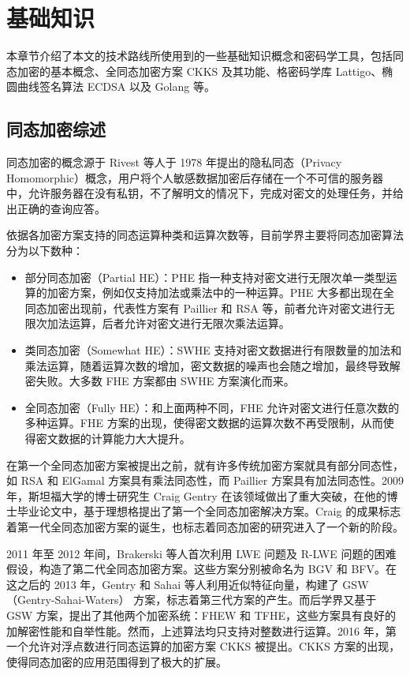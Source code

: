 \chapter{基础知识}

本章节介绍了本文的技术路线所使用到的一些基础知识概念和密码学工具，包括同态加密的基本概念、全同态加密方案 CKKS 及其功能、格密码学库 Lattigo、椭圆曲线签名算法 ECDSA 以及 Golang 等。

\section{同态加密综述}

同态加密的概念源于 Rivest 等人于 1978 年提出的隐私同态（Privacy Homomorphic）概念\cite{rivest1978data}，用户将个人敏感数据加密后存储在一个不可信的服务器中，允许服务器在没有私钥，不了解明文的情况下，完成对密文的处理任务，并给出正确的查询应答。\cite{FHEResearch}

依据各加密方案支持的同态运算种类和运算次数等，目前学界主要将同态加密算法分为以下数种：
\begin{itemize}
    \item 部分同态加密（Partial HE）：PHE 指一种支持对密文进行无限次单一类型运算的加密方案，例如仅支持加法或乘法中的一种运算。PHE 大多都出现在全同态加密出现前，代表性方案有 Paillier 和 RSA 等，前者允许对密文进行无限次加法运算，后者允许对密文进行无限次乘法运算。
    \item 类同态加密（Somewhat HE）：SWHE 支持对密文数据进行有限数量的加法和乘法运算，随着运算次数的增加，密文数据的噪声也会随之增加，最终导致解密失败。大多数 FHE 方案都由 SWHE 方案演化而来。
    \item 全同态加密（Fully HE）：和上面两种不同，FHE 允许对密文进行任意次数的多种运算。FHE 方案的出现，使得密文数据的运算次数不再受限制，从而使得密文数据的计算能力大大提升。
\end{itemize}

在第一个全同态加密方案被提出之前，就有许多传统加密方案就具有部分同态性，如 RSA 和 ElGamal 方案具有乘法同态性\cite{rivest1978method,elgamal1985public}，而 Paillier 方案具有加法同态性\cite{paillier1999public}。2009 年，斯坦福大学的博士研究生 Craig Gentry 在该领域做出了重大突破，在他的博士毕业论文中，基于理想格提出了第一个全同态加密解决方案\cite{homenc}。Craig 的成果标志着第一代全同态加密方案的诞生，也标志着同态加密的研究进入了一个新的阶段。

2011 年至 2012 年间，Brakerski 等人首次利用 LWE 问题及 R-LWE 问题的困难假设，构造了第二代全同态加密方案\cite{cryptoeprint:2011/344,cryptoeprint:2011/277,cryptoeprint:2012/144}。这些方案分别被命名为 BGV 和 BFV。在这之后的 2013 年，Gentry 和 Sahai 等人利用近似特征向量，构建了 GSW（Gentry-Sahai-Waters） 方案，标志着第三代方案的产生。而后学界又基于 GSW 方案，提出了其他两个加密系统：FHEW\cite{fhew} 和 TFHE\cite{TFHE}，这些方案具有良好的加解密性能和自举性能。然而，上述算法均只支持对整数进行运算。2016 年，第一个允许对浮点数进行同态运算的加密方案 CKKS 被提出\cite{cryptoeprint:2016/421}。CKKS 方案的出现，使得同态加密的应用范围得到了极大的扩展。

